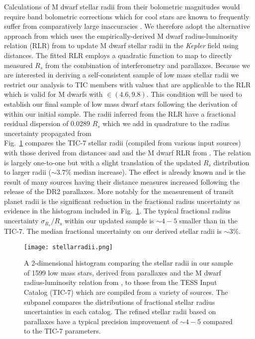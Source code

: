 Calculations of M dwarf stellar radii from their bolometric magnitudes would require \Ks{-}band bolometric
corrections which for cool stars are known to frequently suffer from comparatively large inaccuracies 
\citep[\teff{} $\lesssim 4100$ K;][]{berger18}. We therefore adopt the alternative approach from
\cite{berger18} which uses the empirically-derived M dwarf radius-luminosity relation (RLR) from
\cite{mann15} to update M dwarf stellar radii in the \emph{Kepler} field using \gaia{} distances.
The fitted RLR employs a quadratic function to map
\MK{} to directly measured $R_s$ from the combination of interferometry and parallaxes.
Because we are interested in deriving a
self-consistent sample of low mass stellar radii we restrict our
analysis to TIC members with \MK{} values that are applicable to the \cite{mann15} RLR which
is valid for M dwarfs with \MK{} $\in (4.6,9.8)$. This condition will be used to establish our final
sample of low mass dwarf stars following the derivation of \teff{} within our initial sample.
The radii inferred from the RLR have a fractional residual dispersion of 0.0289 $R_s$ which we add
in quadrature to the radius uncertainty propagated from  \\

Fig.~\ref{fig:Rs} compares the TIC-7 stellar radii (compiled from various input sources) with those
derived from \gaia{} distances and and the M dwarf RLR from \cite{mann15}. The relation is largely one-to-one
but with a slight translation of the updated $R_s$ distribution to larger radii ($\sim 3.7$\% median increase).
The effect is already known \citep{berger18} and is the result of many sources having their distance
measures increased following the release of the \gaia{} DR2 parallaxes. More notably for the measurement of
transit planet radii is the significant reduction in the fractional radius uncertainty as evidence in the
histogram included in Fig.~\ref{fig:Rs}. The typical fractional radius uncertainty $\sigma_{R_{s}}/R_s$ within
our updated sample is $\sim 4-5$ smaller than in the TIC-7. The median fractional uncertainty on our
\gaia{-}derived stellar radii is $\sim 3$\%.

\begin{figure}
  \centering
  \texttt{[image: stellarradii.png]}
  \caption{A 2-dimensional histogram comparing the stellar radii in our sample of 1599 low mass stars,
    derived from \gaia{} parallaxes and the M dwarf radius-luminosity relation from \cite{mann15}, to those
    from the TESS Input Catalog (TIC-7) which are compiled from a variety of sources. The subpanel compares the
    distributions of fractional stellar radius uncertainties in each catalog. The refined stellar radii 
    based on \gaia{} parallaxes have a typical precision improvement of $\sim 4-5$ compared to the TIC-7
    parameters.}
  \label{fig:Rs}
\end{figure}

